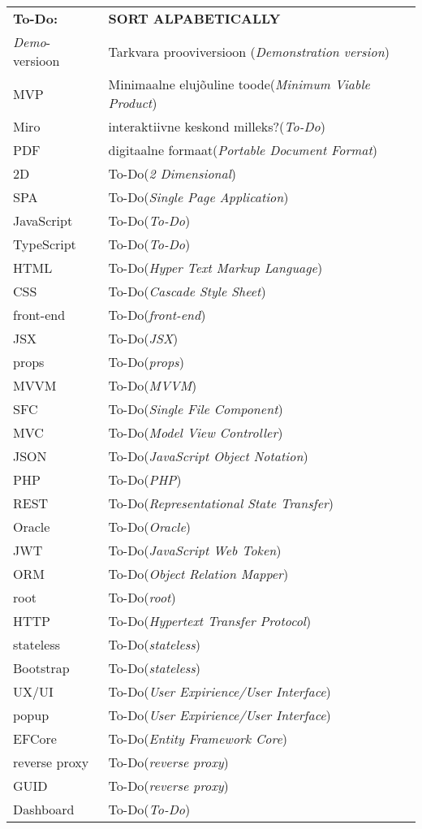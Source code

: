 \begin{longtable}{p{3cm}p{10cm}}
\textbf{To-Do:}&\textbf{SORT ALPABETICALLY}\\
\textit{Demo}-versioon&Tarkvara prooviversioon (\emph{Demonstration version})\\
MVP&Minimaalne elujõuline toode(\emph{Minimum Viable Product})\\
Miro&interaktiivne keskond milleks?(\emph{To-Do})\\
PDF&digitaalne formaat(\emph{Portable Document Format})\\
2D&To-Do(\emph{2 Dimensional})\\
SPA&To-Do(\emph{Single Page Application})\\
JavaScript&To-Do(\emph{To-Do})\\
TypeScript&To-Do(\emph{To-Do})\\
HTML&To-Do(\emph{Hyper Text Markup Language})\\
CSS&To-Do(\emph{Cascade Style Sheet})\\
front-end&To-Do(\emph{front-end})\\
JSX&To-Do(\emph{JSX})\\
props&To-Do(\emph{props})\\
MVVM&To-Do(\emph{MVVM})\\
SFC&To-Do(\emph{Single File Component})\\
MVC&To-Do(\emph{Model View Controller})\\
JSON&To-Do(\emph{JavaScript Object Notation})\\
PHP&To-Do(\emph{PHP})\\
REST&To-Do(\emph{Representational State Transfer})\\
Oracle&To-Do(\emph{Oracle})\\
JWT&To-Do(\emph{JavaScript Web Token})\\
ORM&To-Do(\emph{Object Relation Mapper})\\
root&To-Do(\emph{root})\\
HTTP&To-Do(\emph{Hypertext Transfer Protocol})\\
stateless&To-Do(\emph{stateless})\\
Bootstrap&To-Do(\emph{stateless})\\
UX/UI&To-Do(\emph{User Expirience/User Interface})\\
popup&To-Do(\emph{User Expirience/User Interface})\\
EFCore&To-Do(\emph{Entity Framework Core})\\
reverse proxy&To-Do(\emph{reverse proxy})\\
GUID&To-Do(\emph{reverse proxy})\\
Dashboard&To-Do(\emph{To-Do})\\

\end{longtable}
\addtocounter{table}{-1} 
